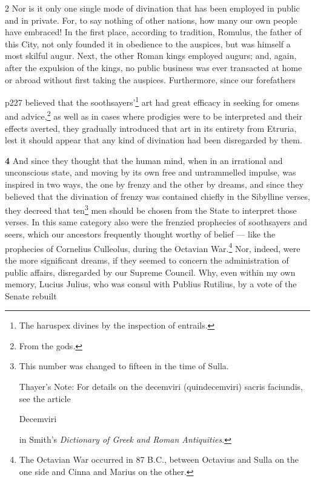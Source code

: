 2
Nor is it only one single mode of divination that has been employed in public and in private. For, to say nothing of other nations, how many our own people have embraced! In the first place, according to tradition, Romulus, the father of this City, not only founded it in obedience to the auspices, but was himself a most skilful augur. Next, the other Roman kings employed augurs; and, again, after the expulsion of the kings, no public business was ever transacted at home or abroad without first taking the auspices. Furthermore, since our forefathers

p227 believed that the soothsayers'\texthebrew{}\footnote{The haruspex divines by the inspection of entrails.

} art had great efficacy in seeking for omens and advice,\texthebrew{}\footnote{From the gods.

} as well as in cases where prodigies were to be interpreted and their effects averted, they gradually introduced that art in its entirety from Etruria, lest it should appear that any kind of divination had been disregarded by them.

\textbf{4} And since they thought that the human mind, when in an irrational and unconscious state, and moving by its own free and untrammelled impulse, was inspired in two ways, the one by frenzy and the other by dreams, and since they believed that the divination of frenzy was contained chiefly in the Sibylline verses, they decreed that ten\texthebrew{}\footnote{This number was changed to fifteen in the time of Sulla.

Thayer's Note: For details on the decemviri (quindecemviri) sacris faciundis, see the article

Decemviri

in Smith's \emph{Dictionary of Greek and Roman Antiquities}.

} men should be chosen from the State to interpret those verses. In this same category also were the frenzied prophecies of soothsayers and seers, which our ancestors frequently thought worthy of belief \texthebrew{—} like the prophecies of Cornelius Culleolus, during the Octavian War.\texthebrew{}\footnote{The Octavian War occurred in 87 B.C., between Octavius and Sulla on the one side and Cinna and Marius on the other.

} Nor, indeed, were the more significant dreams, if they seemed to concern the administration of public affairs, disregarded by our Supreme Council. Why, even within my own memory, Lucius Julius, who was consul with Publius Rutilius, by a vote of the Senate rebuilt


